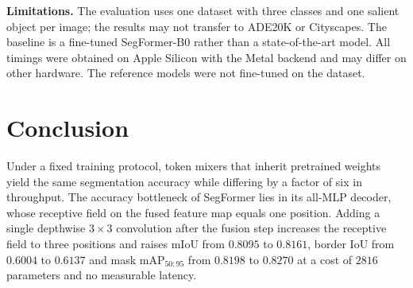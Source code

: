 \documentclass[3p,times,number]{elsarticle}
\begin{document}
\textbf{Limitations.} The evaluation uses one dataset with three classes and one salient
object per image; the results may not transfer to ADE20K or Cityscapes. The baseline is a
fine-tuned SegFormer-B0 rather than a state-of-the-art model. All timings were obtained on
Apple Silicon with the Metal backend and may differ on other hardware. The reference models
were not fine-tuned on the dataset.

\section{Conclusion}

Under a fixed training protocol, token mixers that inherit pretrained weights yield the same
segmentation accuracy while differing by a factor of six in throughput. The accuracy
bottleneck of SegFormer lies in its all-MLP decoder, whose receptive field on the fused
feature map equals one position. Adding a single depthwise $3 \times 3$ convolution after
the fusion step increases the receptive field to three positions and raises mIoU from
$0.8095$ to $0.8161$, border IoU from $0.6004$ to $0.6137$ and mask
$\mathrm{mAP}_{50:95}$ from $0.8198$ to $0.8270$ at a cost of $2816$ parameters and no
measurable latency.
\end{document}

